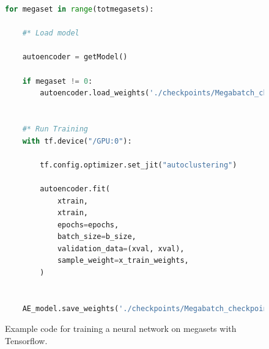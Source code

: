 \begin{figure}[H]
    \centering
\begin{lstlisting}[language=Python, style=pythonstyle, label={code:megabatch_training}]
for megaset in range(totmegasets):
    
    #* Load model 

    autoencoder = getModel()
    
    if megaset != 0:
        autoencoder.load_weights('./checkpoints/Megabatch_checkpoint')
        
        
    #* Run Training
    with tf.device("/GPU:0"):

        tf.config.optimizer.set_jit("autoclustering")

        autoencoder.fit(
            xtrain,
            xtrain,
            epochs=epochs,
            batch_size=b_size,
            validation_data=(xval, xval),
            sample_weight=x_train_weights,
        )
        
    
    AE_model.save_weights('./checkpoints/Megabatch_checkpoint')

\end{lstlisting}
\caption[Tensorflow neural network training]{Example code for training a neural network on megasets with Tensorflow.}
\label{code:training}
\end{figure}


